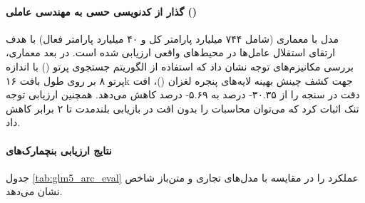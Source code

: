 \item {}

\paragraph*{گذار از کدنویسی حسی به مهندسی عاملی ()}
مدل  \cite{glm5team2026} با معماری  (شامل ۷۴۴ میلیارد پارامتر کل و ۴۰ میلیارد پارامتر فعال) با هدف ارتقای استقلال عامل‌ها در محیط‌های واقعی ارزیابی شده است. در بعد معماری، بررسی مکانیزم‌های توجه نشان داد که استفاده از الگوریتم جستجوی پرتو () با اندازه پرتو ۸ بر روی طول بافت ۱۶k جهت کشف چینش بهینه لایه‌های پنجره لغزان ()، افت دقت در سنجه  را از ۳۰.۳۵- درصد به ۵.۶۹- درصد کاهش می‌دهد. همچنین ارزیابی توجه تنک  اثبات کرد که می‌توان محاسبات را بدون افت در بازیابی بلندمدت تا ۲ برابر کاهش داد.

\paragraph*{نتایج ارزیابی بنچمارک‌های }
جدول \ref{tab:glm5_arc_eval} عملکرد  را در مقایسه با مدل‌های تجاری و متن‌باز شاخص نشان می‌دهد.

\begin{table}[htbp]
\centering
\caption{ارزیابی عملکرد  در آزمون‌های استدلال، کدنویسی و عامل‌ها}
\label{tab:glm5_arc_eval}
\end{table}

